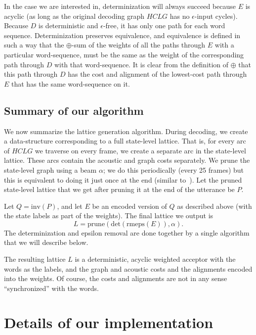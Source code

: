 \documentclass{article}
\def\HCLG{{\mathit{HCLG}}}
\def\inv{{\mathrm{inv}}}
\begin{document}
In the case we are interested in, determinization
will always succeed because $E$ is acyclic (as long as the original decoding
graph $\HCLG$ has no $\epsilon$-input cycles).  Because $D$ is deterministic
and $\epsilon$-free, it has only one path for each word sequence. 
Determinization preserves equivalence,
and equivalence is defined in such a way that the $\oplus$-sum of the
weights of all the paths through $E$ with a particular word-sequence, must be the same
as the weight of the corresponding path through $D$ with that word-sequence.
It is clear from the definition of $\oplus$ that this path through
$D$ has the cost and alignment of the lowest-cost path through $E$ that has the
same word-sequence on it.  

\subsection{Summary of our algorithm}

We now summarize the lattice generation algorithm.  During decoding, we create a data-structure
corresponding to a full state-level lattice.  That is, for every arc of $\HCLG$ we traverse
on every frame, we create a separate arc in the state-level lattice.  These arcs
contain the acoustic and graph costs separately.  We prune the state-level graph using
a beam $\alpha$; we do this periodically (every 25 frames) but this is equivalent to
doing it just once at the end (similar to~\cite{efficient_general}).  Let the pruned
state-level lattice that we get after pruning it at the end of the utterance be $P$.

Let $Q = \inv(P)$, and let $E$ be an encoded version of $Q$ as described above (with the
state labels as part of the weights).  The final lattice we output is
\begin{equation}
   L = \mathrm{prune}(\mathrm{det}(\mathrm{rmeps}(E)), \alpha) .
\end{equation}
The determinization and epsilon removal are done together by a single algorithm
that we will describe below.

The resulting lattice $L$ is a deterministic, acyclic weighted acceptor with the 
words as the labels, and the graph and acoustic costs and the alignments
encoded into the weights.  Of course, the costs and alignments are not in any
sense ``synchronized'' with the words.

\section{Details of our implementation}
\end{document}
